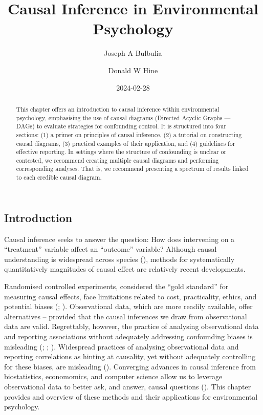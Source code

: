 \documentclass[
  singlecolumn]{article}
\title{Causal Inference in Environmental Psychology}
\author{Joseph A Bulbulia \and Donald W Hine}
\date{2024-02-28}
\begin{document}
\maketitle
\begin{abstract}
This chapter offers an introduction to causal inference within
environmental psychology, emphasising the use of causal diagrams
(Directed Acyclic Graphs --- DAGs) to evaluate strategies for
confounding control. It is structured into four sections: (1) a primer
on principles of causal inference, (2) a tutorial on constructing causal
diagrams, (3) practical examples of their application, and (4)
guidelines for effective reporting. In settings where the structure of
confounding is unclear or contested, we recommend creating multiple
causal diagrams and performing corresponding analyses. That is, we
recommend presenting a spectrum of results linked to each credible
causal diagram.
\end{abstract}

\subsection{Introduction}\label{introduction}

Causal inference seeks to answer the question: How does intervening on a
``treatment'' variable affect an ``outcome'' variable? Although causal
understanding is widespread across species
(), methods for
systematically quantitatively magnitudes of causal effect are relatively
recent developments.

Randomised controlled experiments, considered the ``gold standard'' for
measuring causal effects, face limitations related to cost,
practicality, ethics, and potential biases
(;
).
Observational data, which are more readily available, offer alternatives
-- provided that the causal inferences we draw from observational data
are valid. Regrettably, however, the practice of analysing observational
data and reporting associations without adequately addressing
confounding biases is misleading (; ;
). Widespread
practices of analysing observational data and reporting correlations as
hinting at causality, yet without adequately controlling for these
biases, are misleading (). Converging advances in causal inference from biostatistics,
economomics, and computer science allow us to leverage observational
data to better ask, and answer, causal questions
(). This chapter
provides and overview of these methods and their applications for
environmental psychology.
\end{document}
